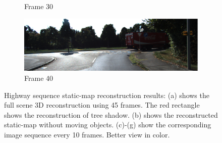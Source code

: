 \documentclass[10pt,twocolumn,letterpaper]{article}  %
\begin{document}
\begin{figure}[t]
\begin{subfigure}{0.2\textwidth}
  	\caption{Frame 30}
  	\label{fig:frame_30}
  	\end{subfigure}%
  	\begin{subfigure}{0.2\textwidth} 
 	\centering
  	\includegraphics[width=1\textwidth]{image/000280.eps}%
  	\caption{Frame 40}
  	\label{fig:frame_40}
  	\end{subfigure}%
  	\caption{Highway sequence static-map reconstruction results: (a) shows the full scene 3D reconstruction using 45 frames. The red rectangle shows the reconstruction of tree shadow. (b) shows the reconstructed static-map without moving objects. (c)-(g) show the corresponding image sequence every 10 frames. Better view in color.}
\label{fig:truck_static_map_Reconst}
\vspace{-3mm}
\end{figure}
\end{document}
